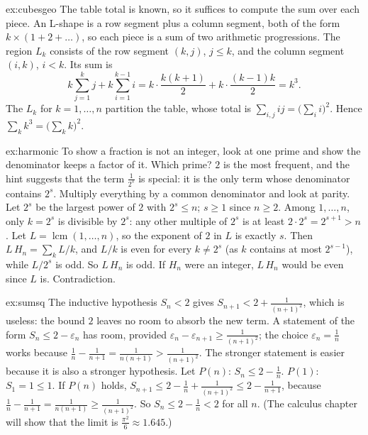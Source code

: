 \begin{solution}{ex:cubesgeo}
\idea The table total is known, so it suffices to compute the sum over each piece. An L-shape is a row segment plus a column segment, both of the form $k\times(1+2+\dots)$, so each piece is a sum of two arithmetic progressions.
\writeup The region $L_k$ consists of the row segment $(k,j)$, $j\le k$, and the column segment $(i,k)$, $i<k$. Its sum is
\[
k\sum_{j=1}^kj+k\sum_{i=1}^{k-1}i=k\cdot\frac{k(k+1)}2+k\cdot\frac{(k-1)k}2=k^3.
\]
The $L_k$ for $k=1,\dots,n$ partition the table, whose total is $\sum_{i,j}ij=\bigl(\sum_i i\bigr)^2$. Hence
$\sum_k k^3=\bigl(\sum_k k\bigr)^2$.
\end{solution}

\begin{solution}{ex:harmonic}
\idea To show a fraction is not an integer, look at one prime and show the denominator keeps a factor of it. Which prime? $2$ is the most frequent, and the hint suggests that the term $\frac1{2^s}$ is special: it is the only term whose denominator contains $2^s$. Multiply everything by a common denominator and look at parity.
\writeup Let $2^s$ be the largest power of $2$ with $2^s\le n$; $s\ge1$ since $n\ge2$. Among $1,\dots,n$, only $k=2^s$
is divisible by $2^s$: any other multiple of $2^s$ is at least $2\cdot2^s=2^{s+1}>n$. Let $L=\operatorname{lcm}(1,\dots,n)$,
so the exponent of $2$ in $L$ is exactly $s$. Then $L\,H_n=\sum_k L/k$, and $L/k$ is even for every $k\ne2^s$ (as $k$ contains at most $2^{s-1}$), while $L/2^s$ is odd.
So $L\,H_n$ is odd. If $H_n$ were an integer, $L\,H_n$ would be even since $L$ is. Contradiction.
\end{solution}

\begin{solution}{ex:sumsq}
\idea The inductive hypothesis $S_n<2$ gives $S_{n+1}<2+\frac1{(n+1)^2}$, which is useless: the bound $2$ leaves no room to absorb the new term. A statement of the form $S_n\le2-\varepsilon_n$ has room, provided $\varepsilon_n-\varepsilon_{n+1}\ge\frac1{(n+1)^2}$; the choice $\varepsilon_n=\frac1n$ works because $\frac1n-\frac1{n+1}=\frac1{n(n+1)}>\frac1{(n+1)^2}$. The stronger statement is easier because it is also a stronger hypothesis.
\writeup Let $P(n)$: $S_n\le2-\frac1n$. $P(1)$: $S_1=1\le1$. If $P(n)$ holds, $S_{n+1}\le2-\frac1n+\frac1{(n+1)^2}\le2-\frac1{n+1}$, because
$\frac1n-\frac1{n+1}=\frac1{n(n+1)}\ge\frac1{(n+1)^2}$. So $S_n\le2-\frac1n<2$ for all $n$. (The calculus chapter will show that the limit is $\frac{\pi^2}6\approx1.645$.)
\end{solution}

